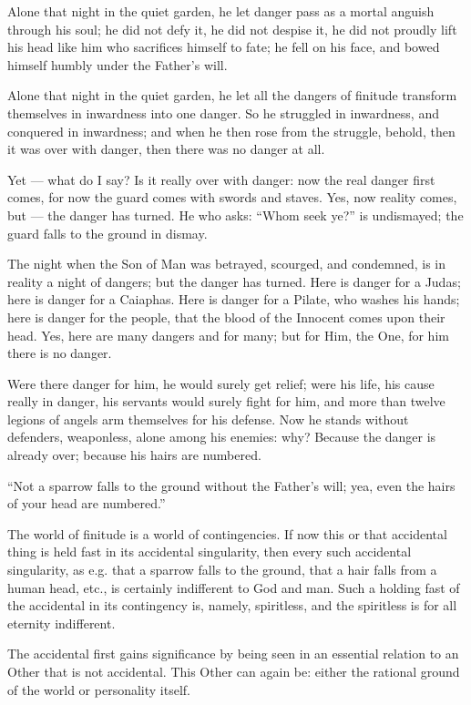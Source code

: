 \documentclass[12pt,a4paper,openany]{book}
\newcommand{\opage}[1]{\marginnote{\footnotesize\textit{[#1]}}}
\begin{document}
Alone that night in the quiet garden, he let
danger pass as a mortal anguish through his
soul; he did not defy it, he did not despise it,
he did not proudly lift his head like him
who sacrifices himself to fate; he fell on his
face, and bowed himself humbly under the Father's
will.

Alone that night in the quiet garden, he let all
the dangers of finitude transform themselves in inwardness
into one danger. So he struggled in inwardness,
and conquered in inwardness; and when he then rose
from the struggle, behold, then it was over with
danger, then there was no danger at all.

\setcounter{footnote}{0}%
\opage{33}Yet --- what do I say? Is it really over
with danger: now the real danger first comes,
for now the guard comes with swords and
staves. Yes, now reality comes, but
--- the danger has turned. He who asks:
``Whom seek ye?'' is undismayed; the guard
falls to the ground in dismay.

The night when the Son of Man was betrayed,
scourged, and condemned, is in reality
a night of dangers; but the danger has turned.
Here is danger for a Judas; here is danger for
a Caiaphas. Here is danger for a Pilate,
who washes his hands; here is danger for
the people, that the blood of the Innocent comes upon
their head. Yes, here are many dangers and for
many; but for Him, the One, for him there is
no danger.

Were there danger for him, he would surely get relief;
were his life, his cause really in
danger, his servants would surely fight for
him, and more than twelve legions of angels arm
themselves for his defense. Now he stands without defenders, weaponless, alone among his enemies:
why? Because the danger is already over; because his
hairs are numbered.

\setcounter{footnote}{0}%
\opage{34}``Not a sparrow falls to the ground without the Father's
will; yea, even the hairs of your head are
numbered.''

The world of finitude is a world of
contingencies. If now this or that
accidental thing is held fast in its accidental singularity, then
every such accidental singularity, as e.g.
that a sparrow falls to the ground, that a
hair falls from a human head, etc., is certainly
indifferent to God and man. Such a
holding fast of the accidental in its contingency
is, namely, spiritless, and the spiritless
is for all eternity indifferent.

The accidental first gains significance by
being seen in an essential relation to an Other
that is not accidental. This Other can
again be: either the rational ground of the world or
personality itself.
\end{document}
